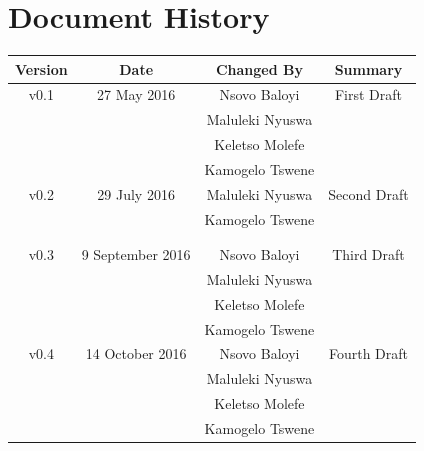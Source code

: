 \documentclass[a4paper,12pt]{article}
\begin{document}
	\newpage
	
	\tableofcontents
	\newpage
	\section*{Document History}
	
	\begin{table}[h!]
		
		\centering %
		\begin{tabular}{c c c c} %
			\hline\hline %
			Version & Date & Changed By & Summary \\ [0.5ex] %
			\hline %
			v0.1 & 27 May 2016 	& Nsovo Baloyi 		& First Draft 
			\\ & 				& Maluleki Nyuswa 	&  
			\\ & 				& Keletso Molefe 	&
			\\ & 				& Kamogelo Tswene 	& \\ [1ex] 
			\hline
			v0.2 & 29 July 2016 & Maluleki Nyuswa	& Second Draft
			\\ & 				& Kamogelo Tswene 	  
			\\ & 				& 	&
			\\ & 				&  	& \\ [1ex] 
			\hline %
			v0.3 & 9 September 2016 	& Nsovo Baloyi 		& Third Draft 
			\\ & 				& Maluleki Nyuswa 	&  
			\\ & 				& Keletso Molefe 	&
			\\ & 				& Kamogelo Tswene 	& \\ [1ex] 
			\hline %
			v0.4 & 14 October 2016 	& Nsovo Baloyi 		& Fourth Draft 
			\\ & 				& Maluleki Nyuswa 	&  
			\\ & 				& Keletso Molefe 	&
			\\ & 				& Kamogelo Tswene 	& \\ [1ex] 
			\hline\hline
		\end{tabular}
		\label{table:nonlin} %
	\end{table}
\end{document}
